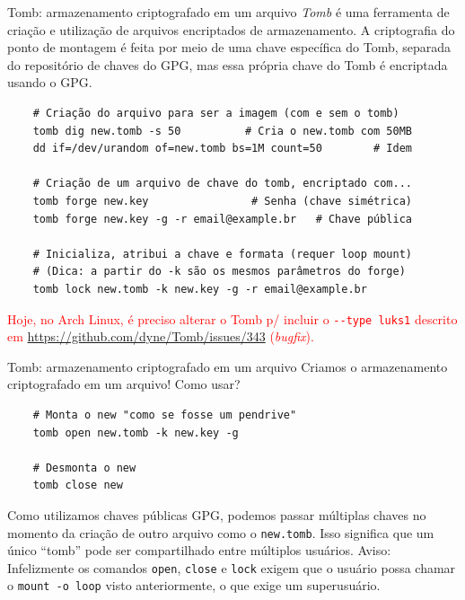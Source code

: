 \documentclass[utf8]{beamer}
\begin{document}
\begin{frame}[fragile]{Tomb: armazenamento criptografado em um arquivo}
  \emph{Tomb} é uma ferramenta de criação e utilização
  de arquivos encriptados de armazenamento.
  A criptografia do ponto de montagem é feita
  por meio de uma chave específica do Tomb,
  separada do repositório de chaves do GPG,
  mas essa própria chave do Tomb é encriptada usando o GPG.
  \vfill
  \begin{verbatim}
    # Criação do arquivo para ser a imagem (com e sem o tomb)
    tomb dig new.tomb -s 50          # Cria o new.tomb com 50MB
    dd if=/dev/urandom of=new.tomb bs=1M count=50        # Idem

    # Criação de um arquivo de chave do tomb, encriptado com...
    tomb forge new.key                # Senha (chave simétrica)
    tomb forge new.key -g -r email@example.br   # Chave pública

    # Inicializa, atribui a chave e formata (requer loop mount)
    # (Dica: a partir do -k são os mesmos parâmetros do forge)
    tomb lock new.tomb -k new.key -g -r email@example.br
  \end{verbatim}
  \textcolor{red}{\small
    Hoje, no Arch Linux,
    é preciso alterar o Tomb
    p/ incluir o \texttt{-{}-type luks1} descrito em
    \url{https://github.com/dyne/Tomb/issues/343} (\emph{bugfix}).
  }
\end{frame}


\begin{frame}[fragile]{Tomb: armazenamento criptografado em um arquivo}
  Criamos o armazenamento criptografado em um arquivo! Como usar?
  \vfill
  \begin{verbatim}
    # Monta o new "como se fosse um pendrive"
    tomb open new.tomb -k new.key -g

    # Desmonta o new
    tomb close new
  \end{verbatim}
  \vfill
  Como utilizamos chaves públicas GPG,
  podemos passar múltiplas chaves
  no momento da criação de outro arquivo como o \texttt{new.tomb}.
  Isso significa que um único ``tomb''
  pode ser compartilhado entre múltiplos usuários.
  \vfill
  Aviso: Infelizmente
  os comandos \texttt{open}, \texttt{close} e \texttt{lock}
  exigem que o usuário possa chamar o \texttt{mount -o loop}
  visto anteriormente, o que exige um superusuário.
\end{frame}
\end{document}
